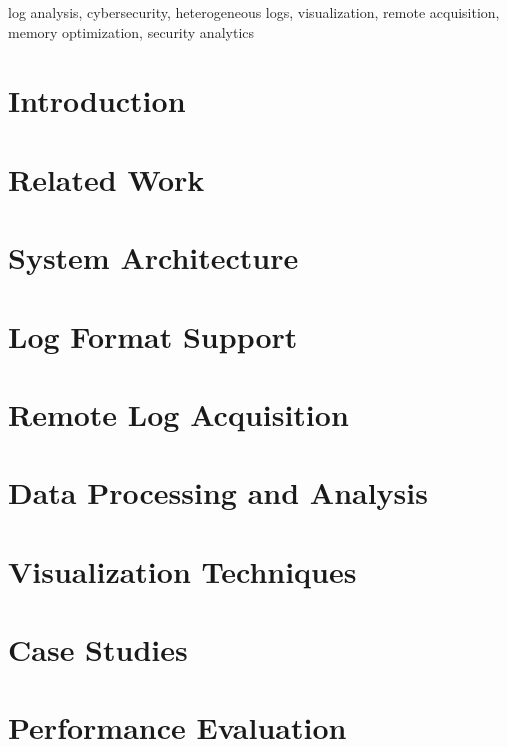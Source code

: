 \documentclass[conference]{IEEEtran}
\begin{document}
\begin{IEEEkeywords}
log analysis, cybersecurity, heterogeneous logs, visualization, remote acquisition, memory optimization, security analytics
\end{IEEEkeywords}

\section{Introduction}

\section{Related Work}

\section{System Architecture}

\section{Log Format Support}

\section{Remote Log Acquisition}

\section{Data Processing and Analysis}

\section{Visualization Techniques}

\section{Case Studies}

\section{Performance Evaluation}
\end{document}
